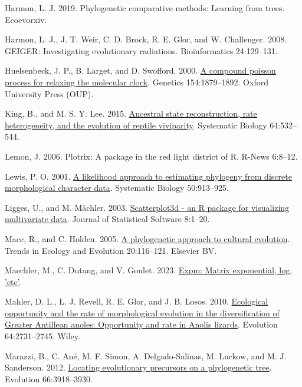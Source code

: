 \documentclass[fleqn,10pt,lineno]{wlpeerj} %
\newlength{\cslhangindent}
\newenvironment{CSLReferences}[2] %
 {\begin{list}{}{%
  \setlength{\itemindent}{0pt}
  \setlength{\leftmargin}{0pt}
  \setlength{\parsep}{0pt}
  \ifodd #1
   \setlength{\leftmargin}{\cslhangindent}
   \setlength{\itemindent}{-1\cslhangindent}
  \fi
  \setlength{\itemsep}{#2\baselineskip}}}
 {\end{list}}
\begin{document}
\begin{CSLReferences}{1}{0}
Harmon, L. J. 2019. Phylogenetic comparative methods: Learning from trees. Ecoevorxiv.

Harmon, L. J., J. T. Weir, C. D. Brock, R. E. Glor, and W. Challenger. 2008. {GEIGER}: Investigating evolutionary radiations. Bioinformatics 24:129--131.

Huelsenbeck, J. P., B. Larget, and D. Swofford. 2000. \href{https://doi.org/10.1093/genetics/154.4.1879}{A compound poisson process for relaxing the molecular clock}. Genetics 154:1879--1892. Oxford University Press (OUP).

King, B., and M. S. Y. Lee. 2015. \href{https://doi.org/10.1093/sysbio/syv005}{Ancestral state reconstruction, rate heterogeneity, and the evolution of reptile viviparity}. Systematic Biology 64:532--544.

Lemon, J. 2006. Plotrix: A package in the red light district of {R}. R-News 6:8--12.

Lewis, P. O. 2001. \href{https://doi.org/10.1080/106351501753462876}{A likelihood approach to estimating phylogeny from discrete morphological character data}. Systematic Biology 50:913--925.

Ligges, U., and M. Mächler. 2003. \href{https://doi.org/10.18637/jss.v008.i11}{Scatterplot3d - an {R} package for visualizing multivariate data}. Journal of Statistical Software 8:1--20.

Mace, R., and C. Holden. 2005. \href{https://doi.org/10.1016/j.tree.2004.12.002}{A phylogenetic approach to cultural evolution}. Trends in Ecology and Evolution 20:116--121. Elsevier BV.

Maechler, M., C. Dutang, and V. Goulet. 2023. \href{https://CRAN.R-project.org/package=expm}{Expm: Matrix exponential, log, 'etc'}.

Mahler, D. L., L. J. Revell, R. E. Glor, and J. B. Losos. 2010. \href{https://doi.org/10.1111/j.1558-5646.2010.01026.x}{Ecological opportunity and the rate of morphological evolution in the diversification of {G}reater {A}ntillean anoles: Opportunity and rate in {A}nolis lizards}. Evolution 64:2731--2745. Wiley.

Marazzi, B., C. Ané, M. F. Simon, A. Delgado-Salinas, M. Luckow, and M. J. Sanderson. 2012. \href{https://doi.org/10.1111/j.1558-5646.2012.01720.x}{Locating evolutionary precursors on a phylogenetic tree}. Evolution 66:3918--3930.


\end{CSLReferences}
\end{document}
